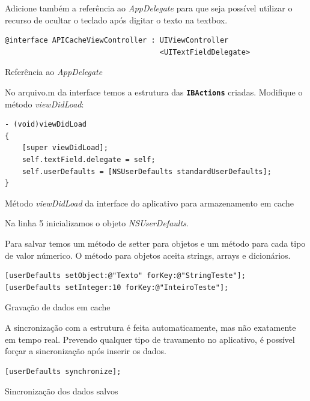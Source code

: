 \documentclass[a4paper,12pt,brazil,oneside]{book}
\begin{document}
Adicione também a referência ao \emph{AppDelegate} para que seja possível utilizar o recurso de ocultar o teclado após digitar o texto na textbox.

\begin{listing}[H]
\begin{verbatim}
@interface APICacheViewController : UIViewController 
									<UITextFieldDelegate>
\end{verbatim}
\caption{Referência ao \emph{AppDelegate}}
\end{listing}

No arquivo.m da interface temos a estrutura das \texttt{\textbf{IBActions}} criadas.
Modifique o método \emph{viewDidLoad}:

\begin{listing}[H]
\begin{verbatim}
- (void)viewDidLoad
{
    [super viewDidLoad];
    self.textField.delegate = self;
    self.userDefaults = [NSUserDefaults standardUserDefaults];
}
\end{verbatim}
\caption{Método \emph{viewDidLoad} da interface do aplicativo para armazenamento em cache}
\end{listing}

Na linha 5 inicializamos o objeto \emph{NSUserDefaults}.

Para salvar temos um método de setter para objetos e um método para cada tipo de valor númerico. O método para objetos aceita strings, arrays e dicionários.

\begin{listing}[H]
\begin{verbatim}
[userDefaults setObject:@"Texto" forKey:@"StringTeste"];
[userDefaults setInteger:10 forKey:@"InteiroTeste"];
\end{verbatim}
\caption{Gravação de dados em cache}
\end{listing}


A sincronização com a estrutura é feita automaticamente, mas não exatamente em tempo real. Prevendo qualquer tipo de travamento no aplicativo, é possível forçar a sincronização após inserir os dados.

\begin{listing}[H]
\begin{verbatim}
[userDefaults synchronize];
\end{verbatim}
\caption{Sincronização dos dados salvos}
\end{listing}
\end{document}
